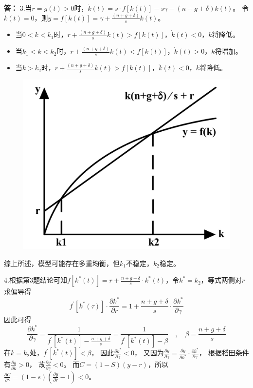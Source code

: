 \documentclass[12pt, a4paper, oneside]{article}
\newcounter{answername}
\newenvironment{answer}{\stepcounter{answername}\par\noindent\textbf{答：}\newline}{\\\par}
\begin{document}
\begin{CJK*}{UTF8}{gbsn}
\begin{answer}
\noindent
3.当$r=g(t)>0$时，$\dot{k}(t)=s \cdot f[k(t)]-s \gamma-(n+g+\delta) k(t)$。
令$\dot{k}(t)=0$，则$y=f[k(t)]=\gamma+\frac{(n+g+\delta)}{s} k(t)$。
\begin{itemize}
	\item 当$0<k<k_1$时，$r+\frac{(n+g+\delta)}{s} k(t)>f[k(t)]$，$\dot{k}(t)<0$，$k$将降低。
	\item 当$k_1<k<k_2$时，$r+\frac{(n+g+\delta)}{s} k(t)<f[k(t)]$，$\dot{k}(t)>0$，$k$将增加。
	\item 当$k>k_2$时，$r+\frac{(n+g+\delta)}{s} k(t)>f[k(t)]$，$\dot{k}(t)<0$，$k$将降低。
\end{itemize}
\begin{figure}[htpb]
  \begin{center}
    \includegraphics[width=0.6 \linewidth]
    {pic/1_3.png}
  \end{center}
\end{figure}
综上所述，模型可能存在多重均衡，但$k_1$不稳定，$k_2$稳定。

\noindent
4.根据第3题结论可知$f\left[k^{*}(t)\right]=r+\frac{n+g+\delta}{s} \cdot k^{*}(t)$，令$k^{*}=k_2$，等式两侧对$r$求偏导得
$$
f^{\prime}\left[k^{*}(\tau)\right] \cdot \frac{\partial k^{*}}{\partial r}=1+\frac{n+g+\delta}{s} \cdot \frac{\partial k^{*}}{\partial \gamma}
$$
因此可得
$$
\frac{\partial k^{*}}{\partial \gamma}=\frac{1}{f^{\prime}\left[k^{*}(t)\right]-\frac{n+g+\delta}{s}}=\frac{1}{f^{\prime}\left[k^{*}(t)\right]-\beta} \quad, \quad \beta=\frac{n+g+\delta}{s}
$$
在$k=k_2$处，$f^{\prime}\left[k^{*}(t)\right]<\beta$，
因此$\frac{\partial k^{*}}{\partial \gamma}<0$，
又因为$\frac{\partial y}{\partial \gamma}=\frac{\partial y}{\partial k^{*}} \cdot \frac{\partial k^{*}}{\partial \gamma}$，
根据稻田条件有$\frac{\partial y}{\partial k}>0$，
故$\frac{\partial y}{\partial \gamma}<0$。
而$C=(1-S)(y-r)$，所以$\frac{\partial C}{\partial \gamma}=(1-s)\left(\frac{\partial y}{\partial r}-1\right)<0$。


\end{answer}
\end{CJK*}
\end{document}
